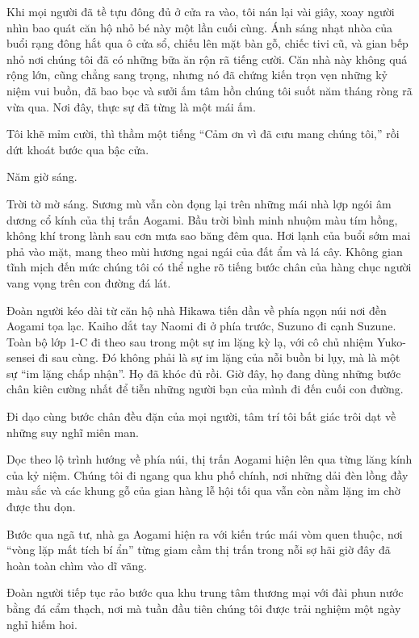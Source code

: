 \documentclass[../main.tex]{subfiles}
\begin{document}
Khi mọi người đã tề tựu đông đủ ở cửa ra vào, tôi nán lại vài giây, xoay người nhìn bao quát căn hộ nhỏ bé này một lần cuối cùng. Ánh sáng nhạt nhòa của buổi rạng đông hắt qua ô cửa sổ, chiếu lên mặt bàn gỗ, chiếc tivi cũ, và gian bếp nhỏ nơi chúng tôi đã có những bữa ăn rộn rã tiếng cười. Căn nhà này không quá rộng lớn, cũng chẳng sang trọng, nhưng nó đã chứng kiến trọn vẹn những kỷ niệm vui buồn, đã bao bọc và sưởi ấm tâm hồn chúng tôi suốt năm tháng ròng rã vừa qua. Nơi đây, thực sự đã từng là một mái ấm.

Tôi khẽ mỉm cười, thì thầm một tiếng ``Cảm ơn vì đã cưu mang chúng tôi,'' rồi dứt khoát bước qua bậc cửa.

\ct

Năm giờ sáng.

Trời tờ mờ sáng. Sương mù vẫn còn đọng lại trên những mái nhà lợp ngói âm dương cổ kính của thị trấn Aogami. Bầu trời bình minh nhuộm màu tím hồng, không khí trong lành sau cơn mưa sao băng đêm qua. Hơi lạnh của buổi sớm mai phả vào mặt, mang theo mùi hương ngai ngái của đất ẩm và lá cây. Không gian tĩnh mịch đến mức chúng tôi có thể nghe rõ tiếng bước chân của hàng chục người vang vọng trên con đường đá lát.

Đoàn người kéo dài từ căn hộ nhà Hikawa tiến dần về phía ngọn núi nơi đền Aogami tọa lạc. Kaiho dắt tay Naomi đi ở phía trước, Suzuno đi cạnh Suzune. Toàn bộ lớp 1-C đi theo sau trong một sự im lặng kỳ lạ, với cô chủ nhiệm Yuko-sensei đi sau cùng. Đó không phải là sự im lặng của nỗi buồn bi lụy, mà là một sự ``im lặng chấp nhận''. Họ đã khóc đủ rồi. Giờ đây, họ đang dùng những bước chân kiên cường nhất để tiễn những người bạn của mình đi đến cuối con đường.

Đi dạo cùng bước chân đều đặn của mọi người, tâm trí tôi bất giác trôi dạt về những suy nghĩ miên man.

Dọc theo lộ trình hướng về phía núi, thị trấn Aogami hiện lên qua từng lăng kính của kỷ niệm. Chúng tôi đi ngang qua khu phố chính, nơi những dải đèn lồng đầy màu sắc và các khung gỗ của gian hàng lễ hội tối qua vẫn còn nằm lặng im chờ được thu dọn.

Bước qua ngã tư, nhà ga Aogami hiện ra với kiến trúc mái vòm quen thuộc, nơi ``vòng lặp mất tích bí ẩn'' từng giam cầm thị trấn trong nỗi sợ hãi giờ đây đã hoàn toàn chìm vào dĩ vãng.

Đoàn người tiếp tục rảo bước qua khu trung tâm thương mại với đài phun nước bằng đá cẩm thạch, nơi mà tuần đầu tiên chúng tôi được trải nghiệm một ngày nghỉ hiếm hoi.
\end{document}
